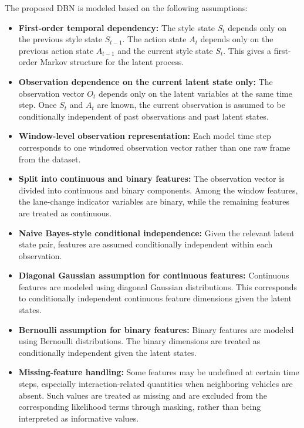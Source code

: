 The proposed \ac{DBN} is modeled based on the following assumptions:
\begin{itemize}
    \item \textbf{First-order temporal dependency:}  
    The style state \(S_t\) depends only on the previous style state \(S_{t-1}\).  
    The action state \(A_t\) depends only on the previous action state \(A_{t-1}\) and the current style state \(S_t\).  
    This gives a first-order Markov structure for the latent process.
    \item \textbf{Observation dependence on the current latent state only:}  
    The observation vector \(O_t\) depends only on the latent variables at the same time step.  
    Once \(S_t\) and \(A_t\) are known, the current observation is assumed to be conditionally independent of past observations and past latent states.
    \item \textbf{Window-level observation representation:}  
    Each model time step corresponds to one windowed observation vector rather than one raw frame from the dataset. 
    \item \textbf{Split into continuous and binary features:}  
    The observation vector is divided into continuous and binary components.  
    Among the window features, the lane-change indicator variables are binary, while the remaining features are treated as continuous.
    \item \textbf{Naive Bayes-style conditional independence:}  
    Given the relevant latent state pair, features are assumed conditionally independent within each observation.
    \item \textbf{Diagonal Gaussian assumption for continuous features:}  
    Continuous features are modeled using diagonal Gaussian distributions.  
    This corresponds to conditionally independent continuous feature dimensions given the latent states.
    \item \textbf{Bernoulli assumption for binary features:}  
    Binary features are modeled using Bernoulli distributions.  
    The binary dimensions are treated as conditionally independent given the latent states.
    \item \textbf{Missing-feature handling:}  
    Some features may be undefined at certain time steps, especially interaction-related quantities when neighboring vehicles are absent.  
    Such values are treated as missing and are excluded from the corresponding likelihood terms through masking, rather than being interpreted as informative values.
\end{itemize}





